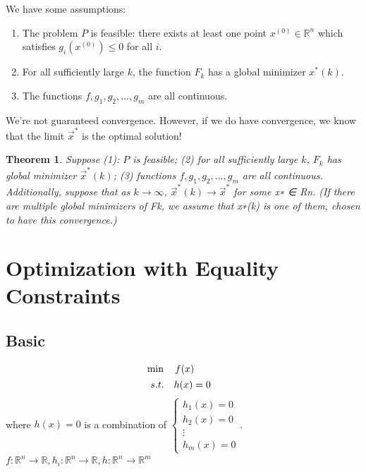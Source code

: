\documentclass[11pt,a4paper]{article}
\newtheorem{theorem}{Theorem}
\begin{document}
We have some assumptions:
\begin{enumerate}[$(1)$]
    \item The problem $P$ is feasible: there exists at least one point $x^{(0)} \in \mathbb{R}^n$ which satisfies $g_i(x^{(0)}) \leq 0$ for all $i$.
    \item For all sufficiently large $k$, the function $F_k$ has a global minimizer $x^*(k)$.
    \item The functions $f,g_1,g_2,...,g_m$ are all continuous.
\end{enumerate}
We're not guaranteed convergence. However, if we do have convergence, we know that the limit $\vec{x}^*$ is the optimal solution!
\begin{center}
\end{center}
\begin{theorem}
    Suppose (1): $P$ is feasible; (2) for all sufficiently large $k$, $F_k$ has global minimizer $\vec{x}^*(k)$; (3) functions $f,g_1,g_2,...,g_m$ are all continuous.\\
    Additionally, suppose that as $k \rightarrow \infty$, $\vec{x}^*(k) \rightarrow \vec{x}^*$ for some x∗ ∈ Rn. (If there are multiple global minimizers of Fk, we assume that x∗(k) is one of them, chosen to have this convergence.)
\end{theorem}







\section{Optimization with Equality Constraints}
\subsection{Basic}
\begin{align*}
    &\min\quad f(x)\\
    &\begin{array}{r@{\quad}r@{}l@{\quad}l}
    s.t.
    &h(x)=0&\\
\end{array}
\end{align*}
where $h(x)=0$ is a combination of $\left\{\begin{matrix}
    h_1(x)=0\\
    h_2(x)=0\\
    \vdots\\
    h_m(x)=0
\end{matrix}\right.$. $f:\mathbb{R}^n \rightarrow \mathbb{R}, h_i:\mathbb{R}^n \rightarrow \mathbb{R}, h:\mathbb{R}^n \rightarrow \mathbb{R}^m$
\end{document}
